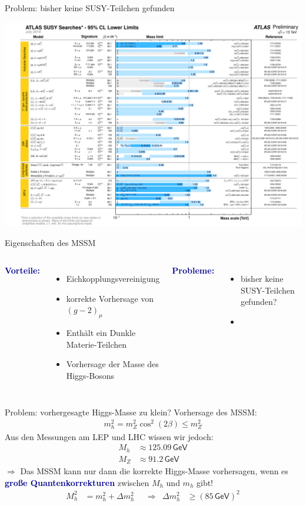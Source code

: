 \documentclass[hyperref={pdfpagelabels=false},ngerman]{beamer}
\newcommand{\eh}[1]{\,\mathsf{#1}}
\renewcommand{\emph}[1]{\textbf{\textcolor{darkblue}{#1}}}
\newcommand{\GeV}{\eh{GeV}}
\begin{document}
\begin{frame}{Problem: bisher keine SUSY-Teilchen gefunden}
  \begin{center}
    \includegraphics[width=\textwidth]{images/ATLAS_SUSY_Summary}
  \end{center}
\end{frame}

\begin{frame}{Eigenschaften des MSSM}
  \begin{columns}
    \emph{Vorteile:}
    \begin{itemize}
    \item Eichkopplungsvereinigung
    \item korrekte Vorhersage von $(g-2)_\mu$
    \item Enthält ein Dunkle Materie-Teilchen
    \item Vorhersage der Masse des Higgs-Bosons
    \end{itemize}
    \emph{Probleme:}
    \begin{itemize}
    \item bisher keine SUSY-Teilchen gefunden?
    \item {}
    \end{itemize}
  \end{columns}
\end{frame}

\begin{frame}{Problem: vorhergesagte Higgs-Masse zu klein?}
  Vorhersage des MSSM:
  \begin{align*}
    m_h^2 = m_Z^2 \cos^2(2\beta) \le m_Z^2
  \end{align*}
  Aus den Messungen am LEP und LHC wissen wir jedoch:
  \begin{align*}
    M_h &\approx 125.09 \GeV \\
    M_Z &\approx 91.2 \GeV
  \end{align*}
  $\Rightarrow$ Das MSSM kann nur dann die korrekte Higgs-Masse
  vorhersagen, wenn es \emph{große Quantenkorrekturen} zwischen $M_h$
  und $m_h$ gibt!
  \begin{align*}
    M_h^2 &= m_h^2 + \Delta m_h^2
    & &\Rightarrow &
    \Delta m_h^2 &\geq (85\eh{GeV})^2
  \end{align*}
\end{frame}
\end{document}
